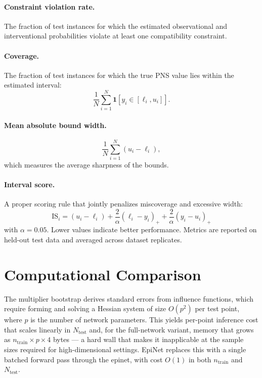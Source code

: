\documentclass[accepted]{uai2026} %
\theoremstyle{plain}
\theoremstyle{definition}
\theoremstyle{remark}
\begin{document}
\paragraph{Constraint violation rate.}
The fraction of test instances for which the estimated observational and
interventional probabilities violate at least one compatibility
constraint.

\paragraph{Coverage.}
The fraction of test instances for which the true PNS value lies within the
estimated interval:
\begin{equation}
    \frac{1}{N}\sum_{i=1}^{N}
    \mathbf{1}\!\left[y_i \in [\ell_i, u_i]\right].
\end{equation}

\paragraph{Mean absolute bound width.}
\begin{equation}
    \frac{1}{N}\sum_{i=1}^{N}(u_i - \ell_i),
\end{equation}
which measures the average sharpness of the bounds.

\paragraph{Interval score.}
A proper scoring rule that jointly penalizes miscoverage and excessive width:
\begin{equation}
    \mathrm{IS}_i = (u_i - \ell_i) + \frac{2}{\alpha}(\ell_i - y_i)_+ + \frac{2}{\alpha}(y_i - u_i)_+
\end{equation}
with $\alpha = 0.05$. Lower values indicate better performance.
Metrics are reported on held-out test data and averaged across dataset
replicates.

\section{Computational Comparison}
\label{app:compute}

The multiplier bootstrap derives standard errors from influence functions, which
require forming and solving a Hessian system of size $O(p^2)$ per test point, where
$p$ is the number of network parameters. This yields per-point inference cost that
scales linearly in $N_\mathrm{test}$ and, for the full-network variant, memory that
grows as $n_\mathrm{train} \times p \times 4$ bytes — a hard wall that makes it
inapplicable at the sample sizes required for high-dimensional settings. EpiNet
replaces this with a single batched forward pass through the epinet, with cost
$O(1)$ in both $n_\mathrm{train}$ and $N_\mathrm{test}$.
\end{document}
